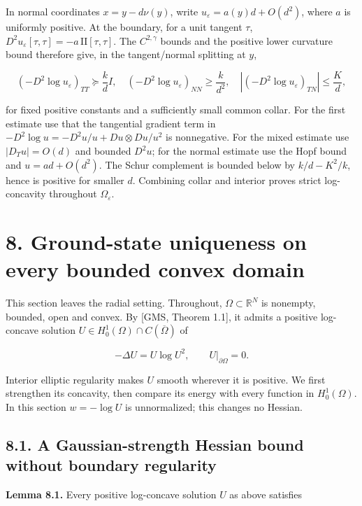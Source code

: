 \documentclass[11pt]{article}
\begin{document}
In normal coordinates \(x=y-d\nu(y)\), write
\(u_\varepsilon=a(y)d+O(d^2)\), where \(a\) is uniformly positive. At
the boundary, for a unit tangent \(\tau\),
\(D^2u_\varepsilon[\tau,\tau]=-a\,\mathrm{II}[\tau,\tau]\). The
\(C^{2,\gamma}\) bounds and the positive lower curvature bound therefore
give, in the tangent/normal splitting at \(y\),

\[(-D^2\log u_\varepsilon)_{TT}\succeq \frac{k}{d}I,
\quad (-D^2\log u_\varepsilon)_{NN}\geq\frac{k}{d^2},
\quad |(-D^2\log u_\varepsilon)_{TN}|\leq\frac Kd, \tag{D18}\]

for fixed positive constants and a sufficiently small common collar. For
the first estimate use that the tangential gradient term in
\(-D^2\log u=-D^2u/u+Du\otimes Du/u^2\) is nonnegative. For the mixed
estimate use \(|D_Tu|=O(d)\) and bounded \(D^2u\); for the normal
estimate use the Hopf bound and \(u=a d+O(d^2)\). The Schur complement
is bounded below by \(k/d-K^2/k\), hence is positive for smaller \(d\).
Combining collar and interior proves strict log-concavity throughout
\(\Omega_\varepsilon\).

\section{8. Ground-state uniqueness on every bounded convex
domain}\label{ground-state-uniqueness-on-every-bounded-convex-domain}

This section leaves the radial setting. Throughout,
\(\Omega\subset\mathbb R^N\) is nonempty, bounded, open and convex. By
{[}GMS, Theorem 1.1{]}, it admits a positive log-concave solution
\(U\in H^1_0(\Omega)\cap C(\overline\Omega)\) of

\[-\Delta U=U\log U^2,\qquad U|_{\partial\Omega}=0.\]

Interior elliptic regularity makes \(U\) smooth wherever it is positive.
We first strengthen its concavity, then compare its energy with every
function in \(H^1_0(\Omega)\). In this section \(w=-\log U\) is
unnormalized; this changes no Hessian.

\subsection{8.1. A Gaussian-strength Hessian bound without boundary
regularity}\label{a-gaussian-strength-hessian-bound-without-boundary-regularity}

\textbf{Lemma 8.1.} Every positive log-concave solution \(U\) as above
satisfies
\end{document}
